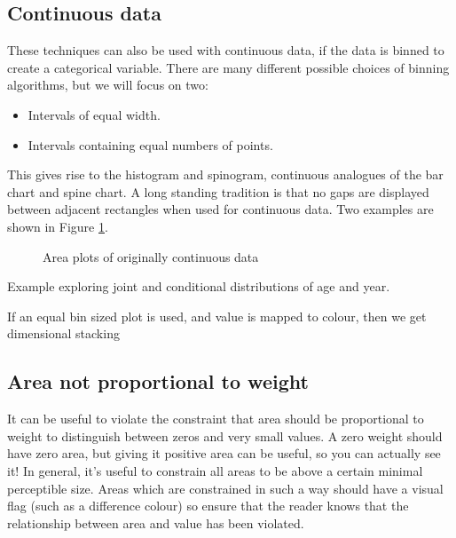 \documentclass[journal]{vgtc}
\begin{document}
\subsection{Continuous data}
\label{sub:continuous_data}

These techniques can also be used with continuous data, if the data is binned to create a categorical variable. There are many different possible choices of binning algorithms, but we will focus on two:

\begin{itemize}
  \item Intervals of equal width.
  \item Intervals containing equal numbers of points.
\end{itemize}

This gives rise to the histogram and spinogram, continuous analogues of the bar chart and spine chart. A long standing tradition is that no gaps are displayed between adjacent rectangles when used for continuous data. Two examples are shown in Figure \ref{fig:cont-examples}.

\begin{figure}[htbp]
  \centering
  \caption{Area plots of originally continuous data}
  \label{fig:cont-examples}
\end{figure}

Example exploring joint and conditional distributions of age and year.

If an equal bin sized plot is used, and value is mapped to colour, then we get  dimensional stacking \citep{leblanc:1990}



\subsection{Area not proportional to weight}

It can be useful to violate the constraint that area should be proportional to weight to distinguish between zeros and very small values. A zero weight should have zero area, but giving it positive area can be useful, so you can actually see it! In general, it's useful to constrain all areas to be above a certain minimal perceptible size.  Areas which are constrained in such a way should have a visual flag (such as a difference colour) so ensure that the reader knows that the relationship between area and value has been violated.
\end{document}
